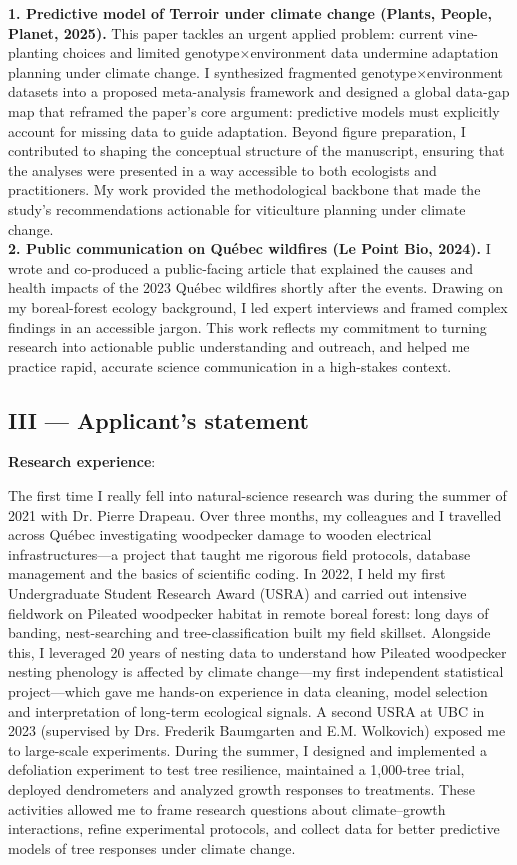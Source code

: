 \documentclass[12pt]{article}
\begin{document}
\textbf{1. Predictive model of Terroir under climate change (Plants, People, Planet, 2025).}  
This paper tackles an urgent applied problem: current vine-planting choices and limited genotype$\times$environment data undermine adaptation planning under climate change. I synthesized fragmented genotype$\times$environment datasets into a proposed meta-analysis framework and designed a global data-gap map that reframed the paper’s core argument: predictive models must explicitly account for missing data to guide adaptation. Beyond figure preparation, I contributed to shaping the conceptual structure of the manuscript, ensuring that the analyses were presented in a way accessible to both ecologists and practitioners. My work provided the methodological backbone that made the study’s recommendations actionable for viticulture planning under climate change.\\
\textbf{2. Public communication on Québec wildfires (Le Point Bio, 2024).}  
I wrote and co-produced a public-facing article that explained the causes and health impacts of the 2023 Québec wildfires shortly after the events. Drawing on my boreal-forest ecology background, I led expert interviews and framed complex findings in an accessible jargon. This work reflects my commitment to turning research into actionable public understanding and outreach, and helped me practice rapid, accurate science communication in a high-stakes context.

\subsection*{III --- Applicant’s statement}

\textbf{Research experience}: 

The first time I really fell into natural-science research was during the summer of 2021 with Dr. Pierre Drapeau. Over three months, my colleagues and I travelled across Québec investigating woodpecker damage to wooden electrical infrastructures---a project that taught me rigorous field protocols, database management and the basics of scientific coding.  In 2022, I held my first Undergraduate Student Research Award (USRA) and carried out intensive fieldwork on Pileated woodpecker habitat in remote boreal forest: long days of banding, nest-searching and tree-classification built my field skillset. Alongside this, I leveraged 20 years of nesting data to understand how Pileated woodpecker nesting phenology is affected by climate change---my first independent statistical project---which gave me hands-on experience in data cleaning, model selection and interpretation of long-term ecological signals. A second USRA at UBC in 2023 (supervised by Drs. Frederik Baumgarten and E.M. Wolkovich) exposed me to large-scale experiments. During the summer, I designed and implemented a defoliation experiment to test tree resilience, maintained a 1,000-tree trial, deployed dendrometers and analyzed growth responses to treatments. These activities allowed me to frame research questions about climate–growth interactions, refine experimental protocols, and collect data for better predictive models of tree responses under climate change.
\end{document}
